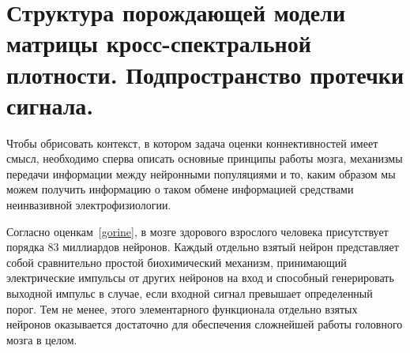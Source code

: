 \chapter{Структура порождающей модели матрицы кросс-спектральной плотности.
         Подпространство протечки сигнала.} \label{chapt1}




Чтобы обрисовать контекст, в котором задача оценки коннективностей имеет смысл,
необходимо сперва описать основные принципы работы мозга, механизмы передачи
информации между нейронными популяциями и то, каким образом мы можем получить
информацию о таком обмене информацией средствами неинвазивной электрофизиологии.

Согласно оценкам~\ref{gorine}, в мозге здорового взрослого человека присутствует
порядка 83 миллиардов нейронов. Каждый отдельно взятый нейрон представляет собой
сравнительно простой биохимический механизм, принимающий электрические импульсы
от других нейронов на вход и способный генерировать выходной импульс в случае,
если входной сигнал превышает определенный порог. Тем не менее, этого элементарного
функционала отдельно взятых нейронов оказывается достаточно для обеспечения сложнейшей работы
головного мозга в целом.


